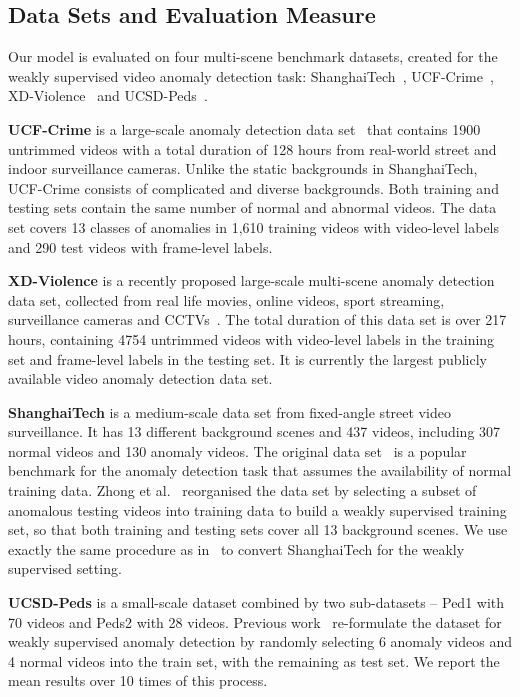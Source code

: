 \documentclass[10pt,twocolumn,letterpaper]{article}
\begin{document}
\subsection{Data Sets and Evaluation Measure}

Our model is evaluated on four multi-scene benchmark datasets, created for the weakly supervised video anomaly detection task: ShanghaiTech~\cite{liu2018future}, UCF-Crime~\cite{sultani2018real}, XD-Violence~\cite{Wu2020not} and UCSD-Peds~\cite{xu2014video}.

\textbf{UCF-Crime} is a large-scale anomaly detection data set~\cite{sultani2018real} that contains 1900 untrimmed videos with a total duration of 128 hours from real-world street and indoor surveillance cameras. Unlike the static backgrounds in ShanghaiTech, UCF-Crime consists of complicated and diverse backgrounds.
Both training and testing sets contain the same number of normal and abnormal videos. The data set covers 13 classes of anomalies in 1,610 training videos with video-level labels and 290 test videos with frame-level labels. 

\textbf{XD-Violence} is a recently proposed large-scale multi-scene anomaly detection data set, collected from real life movies, online videos, sport streaming, surveillance cameras and CCTVs~\cite{Wu2020not}. The total duration of this data set is over 217 hours, containing 4754 untrimmed videos with video-level labels in the training set and frame-level labels in the testing set. It is currently the largest publicly available video anomaly detection data set.


\textbf{ShanghaiTech} is a medium-scale data set from fixed-angle street video surveillance. It has 13 different background scenes and 437 videos, including 307 normal videos and 130 anomaly videos. The original data set~\cite{liu2018future} is a popular benchmark for the anomaly detection task that assumes the availability of normal training data.
Zhong et al.~\cite{zhong2019graph} reorganised the data set by selecting a subset of anomalous testing videos into training data to build a weakly supervised training set,
so that both training and testing sets cover all 13 background scenes. We use exactly the same procedure as in~\cite{zhong2019graph} to convert ShanghaiTech for the weakly supervised setting.


\textbf{UCSD-Peds} is a small-scale dataset combined by two sub-datasets -- Ped1 with 70 videos and Peds2 with 28 videos. Previous work~\cite{zhong2019graph,he2018anomaly} re-formulate the dataset for weakly supervised anomaly detection by randomly selecting 6 anomaly videos and 4 normal videos into the train set, with the remaining as test set. We report the mean results over 10 times of this process.
\end{document}
